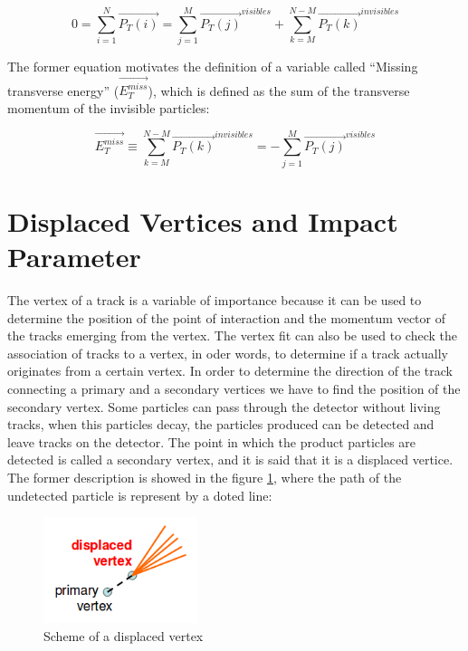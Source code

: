  \begin{equation}
  0 = \sum_{i=1}^N \vec{P_T(i)} = \sum_{j=1}^M \vec{P_T(j)}^{visibles} + \sum_{k=M}^{N-M} \vec{P_T(k)}^{invisibles}
 \end{equation}

 The former equation motivates the definition of a variable called ``Missing transverse energy'' ($\vec{E_T^{miss}}$), which is defined as the sum of the transverse momentum of the invisible
 particles:
 
 \begin{equation}
  \vec{E_T^{miss}} \equiv \sum_{k=M}^{N-M}\vec{P_T(k)}^{invisibles} = - \sum_{j=1}^M  \vec{P_T(j)}^{visibles}
 \end{equation}

 
 \section{Displaced Vertices and Impact Parameter}
The vertex of a track is a variable of importance because it can be used to determine the position of the point of interaction and the momentum vector of the tracks emerging from the vertex. The 
vertex fit can also be used to check the association of tracks to a vertex, in oder words, to determine if a track actually originates from a certain vertex. In order to determine the direction of the track connecting a primary and a secondary vertices we have to find the position of the secondary vertex. Some particles can pass through the detector without living tracks, when this particles decay, the particles produced can be detected and leave tracks on the detector. The point in which the product particles are detected is called a secondary vertex, and it is said that it is a displaced vertice. The former description is showed in the figure \ref{Displaced_vertices}, where the path of the undetected particle is represent by a doted line:

 
 \begin{figure}[h] \label{Displaced_vertices}
 \centering
 \caption{Scheme of a displaced vertex}
 \includegraphics[width=0.4\textwidth]{./Capitulos/VariableDefinitions/Displaced_vertex}  
 \end{figure}
 
